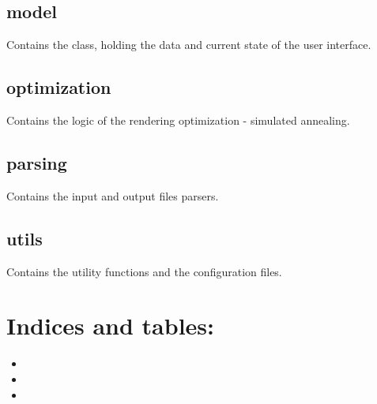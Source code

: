 \documentclass[a4paper,12pt,oneside,english]{sphinxmanual}
\begin{document}
\section{model}
\label{\detokenize{mainmodules:id3}}
Contains the  class, holding the data and current state of the user interface.


\section{optimization}
\label{\detokenize{mainmodules:id4}}
Contains the logic of the rendering optimization - simulated annealing.


\section{parsing}
\label{\detokenize{mainmodules:id5}}
Contains the input and output files parsers.


\section{utils}
\label{\detokenize{mainmodules:id6}}
Contains the utility functions and the configuration files.


\chapter{Indices and tables:}
\label{\detokenize{index:indices-and-tables}}\begin{itemize}
\item {} 

\item {} 

\item {} 

\end{itemize}



\renewcommand{\indexname}{Index}
\printindex
\end{document}
